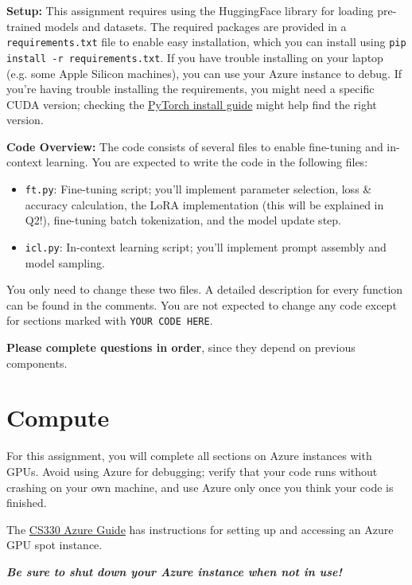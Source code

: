 \documentclass[12pt]{article}
\begin{document}
\textbf{Setup:} This assignment requires using the HuggingFace library for loading pre-trained models and datasets. The required packages are provided in a \texttt{requirements.txt} file to enable easy installation, which you can install using \texttt{pip install -r requirements.txt}. If you have trouble installing on your laptop (e.g. some Apple Silicon machines), you can use your Azure instance to debug. If you're having trouble installing the requirements, you might need a specific CUDA version; checking the \href{https://pytorch.org/get-started/locally/}{PyTorch install guide} might help find the right version.

\textbf{Code Overview:} The code consists of several files to enable fine-tuning and in-context learning. You are expected to write the code in the following files:
\begin{itemize}
    \item \texttt{ft.py}: Fine-tuning script; you'll implement parameter selection, loss \& accuracy calculation, the LoRA implementation (this will be explained in Q2!), fine-tuning batch tokenization, and the model update step.
    \item \texttt{icl.py}: In-context learning script; you'll implement prompt assembly and model sampling.
\end{itemize}

You only need to change these two files. A detailed description for every function can be found in the comments. You are not expected to change any code except for sections marked with \texttt{YOUR CODE HERE}.

\textbf{Please complete questions in order}, since they depend on previous components.

\section*{Compute}

For this assignment, you will complete all sections on Azure instances with GPUs. Avoid using Azure for debugging; verify that your code runs without crashing on your own machine, and use Azure only once you think your code is finished.

The \href{https://docs.google.com/document/d/1wm2m6gQtxgxXV5V7UUDUVOktJjOF_vzxJt29fdn8M5E/edit}{CS330 Azure Guide} has instructions for setting up and accessing an Azure GPU spot instance.

{
\begin{center}
\large
    \textbf{\textit{Be sure to shut down your Azure instance when not in use!}}
\end{center} 
}
\end{document}
